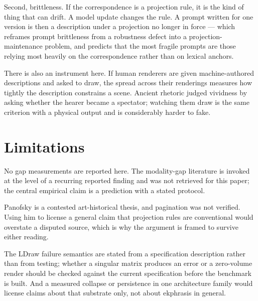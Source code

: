 \documentclass[11pt,a4paper]{article}
\begin{document}
Second, brittleness. If the correspondence is a projection rule, it is the kind of thing that can drift. A model update changes the rule. A prompt written for one version is then a description under a projection no longer in force --- which reframes prompt brittleness from a robustness defect into a projection-maintenance problem, and predicts that the most fragile prompts are those relying most heavily on the correspondence rather than on lexical anchors.

There is also an instrument here. If human renderers are given machine-authored descriptions and asked to draw, the spread across their renderings measures how tightly the description constrains a scene. Ancient rhetoric judged vividness by asking whether the hearer became a spectator; watching them draw is the same criterion with a physical output and is considerably harder to fake.

\section{Limitations}
No gap measurements are reported here. The modality-gap literature is invoked at the level of a recurring reported finding and was not retrieved for this paper; the central empirical claim is a prediction with a stated protocol.

Panofsky is a contested art-historical thesis, and pagination was not verified. Using him to license a general claim that projection rules are conventional would overstate a disputed source, which is why the argument is framed to survive either reading.

The LDraw failure semantics are stated from a specification description rather than from testing; whether a singular matrix produces an error or a zero-volume render should be checked against the current specification before the benchmark is built. And a measured collapse or persistence in one architecture family would license claims about that substrate only, not about ekphrasis in general.
\end{document}

